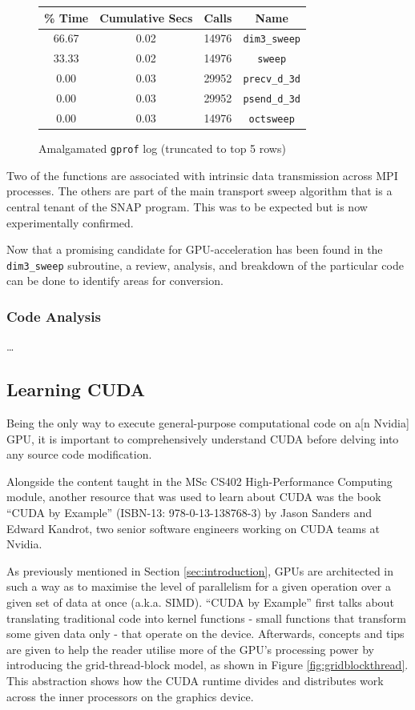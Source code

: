 \documentclass[conference]{IEEEtran}
\begin{document}
\begin{figure}[!h]
    \centering
    \begin{tabular}{ | c | c | c | c | }
\hline
\% Time & Cumulative Secs & Calls & Name \\
\hline
66.67 & 0.02 & 14976 & \texttt{dim3\_sweep} \\
33.33 & 0.02 & 14976 & \texttt{sweep} \\
0.00  & 0.03 & 29952 & \texttt{precv\_d\_3d} \\
0.00  & 0.03 & 29952 & \texttt{psend\_d\_3d} \\
0.00  & 0.03 & 14976 & \texttt{octsweep} \\
\hline
    \end{tabular}
    \caption{Amalgamated \texttt{gprof} log (truncated to top 5 rows)}
    \label{table:gprof_log}
\end{figure}

Two of the functions are associated with intrinsic data transmission across MPI processes. The others are part of the main transport sweep algorithm that is a central tenant of the SNAP program. This was to be expected but is now experimentally confirmed.

Now that a promising candidate for GPU-acceleration has been found in the \texttt{dim3\_sweep} subroutine, a review, analysis, and breakdown of the particular code can be done to identify areas for conversion.


\subsubsection{Code Analysis}

\dots

\subsection{Learning CUDA}

Being the only way to execute general-purpose computational code on a[n Nvidia] GPU, it is important to comprehensively understand CUDA before delving into any source code modification.

Alongside the content taught in the MSc CS402 High-Performance Computing module, another resource that was used to learn about CUDA was the book ``CUDA by Example'' (ISBN-13: 978-0-13-138768-3) by Jason Sanders and Edward Kandrot, two senior software engineers working on CUDA teams at Nvidia.

As previously mentioned in Section \ref{sec:introduction}, GPUs are architected in such a way as to maximise the level of parallelism for a given operation over a given set of data at once (a.k.a. SIMD). ``CUDA by Example'' first talks about translating traditional code into kernel functions - small functions that transform some given data only - that operate on the device. Afterwards, concepts and tips are given to help the reader utilise more of the GPU's processing power by introducing the grid-thread-block model, as shown in Figure \ref{fig:gridblockthread}. This abstraction shows how the CUDA runtime divides and distributes work across the inner processors on the graphics device.
\end{document}
